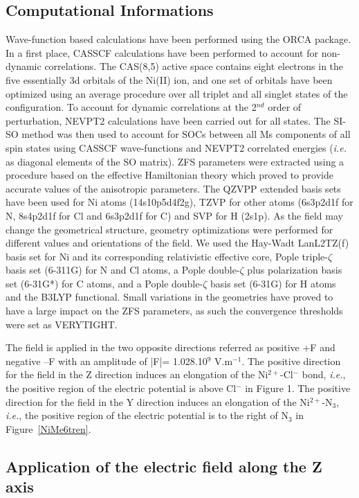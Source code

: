\documentclass[12pt]{report}
\numberwithin{equation}{section}
\begin{document}
\subsection{Computational Informations}
Wave-function based calculations have been performed using the ORCA package.
In a first place, CASSCF calculations have been performed to account for non-dynamic correlations. 
The CAS(8,5) active space contains eight electrons in the five essentially 3d orbitals of the Ni(II) ion, and one set of orbitals have been optimized using an average procedure over all triplet and all singlet states of the configuration.
To account for dynamic correlations at the 2$^{nd}$ order of perturbation, NEVPT2 calculations have been carried out for all states. 
The SI-SO method was then used to account for SOCs between all Ms components of all spin states using CASSCF wave-functions and NEVPT2 correlated energies (\textit{i.e.} as diagonal elements of the SO matrix). 
ZFS parameters were extracted using a procedure based on the effective Hamiltonian theory which proved to provide accurate values of the anisotropic parameters. 
The QZVPP extended basis sets have been used for Ni atoms (14s10p5d4f2g), TZVP for other atoms (6s3p2d1f for N, 8s4p2d1f for Cl and 6s3p2d1f for C) and SVP for H (2s1p). 
As the field may change the geometrical structure, geometry optimizations were performed for different values and orientations of the field. 
We used the Hay-Wadt LanL2TZ(f) basis set for Ni and its corresponding relativistic effective core, Pople triple-$\zeta$ basis set (6-311G) for N and Cl atoms, a Pople double-$\zeta$ plus polarization basis set (6-31G*) for C atoms, and a Pople double-$\zeta$ basis set (6-31G) for H atoms and the B3LYP functional.
Small variations in the geometries have proved to have a large impact on the ZFS parameters, as such the convergence thresholds were set as VERYTIGHT.

The field is applied in the two opposite directions referred as positive +F and negative –F with an amplitude of |F|= 1.028.10$^9$ V.m$^{-1}$.
The positive direction for the field in the Z direction induces an elongation of the Ni$^{2+}$-Cl$^-$ bond, \textit{i.e.}, the positive region of the electric potential is above Cl$^-$ in Figure 1. 
The positive direction for the field in the Y direction induces an elongation of the Ni$^{2+}$-N$_3$, \textit{i.e.}, the positive region of the electric potential is to the right of N$_3$ in Figure~\ref{NiMe6tren}.

\subsection{Application of the electric field along the Z axis}
\end{document}
